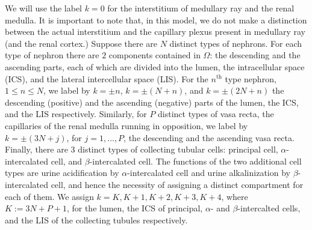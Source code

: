 \documentclass{article}
\begin{document}
We will use the label
$k=0$ for the interstitium of medullary ray and the renal medulla.
It is important to note that, in this model, we do not make a distinction between the actual interstitium and the capillary plexus present in medullary ray (and the renal cortex.)
Suppose there are $N$ distinct types of nephrons.
For each type of nephron there are $2$ components contained in $\Omega$: the descending and the ascending parts, each of which are divided into the lumen, the intracellular space (ICS), and the lateral intercellular space (LIS).
For the $n^{\mathrm{th}}$ type nephron, $1\leq n\leq N$, we label by $k=\pm n$, $k=\pm(N+n)$, and $k=\pm(2N+n)$ the descending (positive) and the ascending (negative) parts of the lumen, the ICS, and the LIS respectively.
Similarly, for $P$ distinct types of vasa recta, the capillaries of the renal medulla running in opposition, we label by $k=\pm(3N+j)$, for $j=1,\dots,P$, the descending and the ascending vasa recta.
Finally, there are 3 distinct types of collecting tubular cells: principal cell, $\alpha$-intercalated cell, and $\beta$-intercalated cell.
The functions of the two additional cell types are urine acidification by $\alpha$-intercalated cell and urine alkalinization by $\beta$-intercalated cell, and hence the necessity of assigning a distinct compartment for each of them.
We assign $k=K,K+1,K+2,K+3,K+4$, where $K:=3N+P+1$, for the lumen, the ICS of principal, $\alpha$- and $\beta$-intercalted cells, and the LIS of the collecting tubules respectively.
\end{document}
